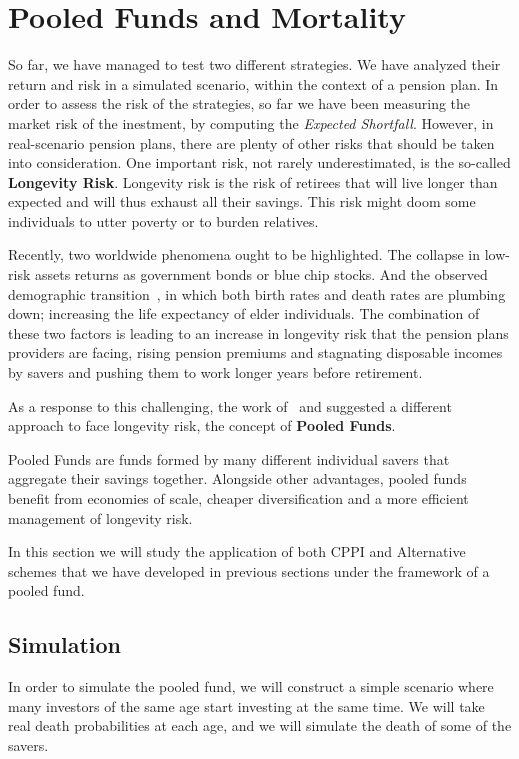 \section{Pooled Funds and Mortality}

So far, we have managed to test two different strategies. We have analyzed their return and risk in a simulated scenario, within the context of a pension plan. In order to assess the risk of the strategies, so far we have been measuring the market risk of the inestment, by computing the \emph{Expected Shortfall}. However, in real-scenario pension plans, there are plenty of other risks that should be taken into consideration. One important risk, not rarely underestimated, is the so-called \textbf{Longevity Risk}. Longevity risk is the risk of retirees that will live longer than expected and will thus exhaust all their savings. This risk might doom some individuals to utter poverty or to burden relatives.

Recently, two worldwide phenomena ought to be highlighted. The collapse in low-risk assets returns as government bonds or blue chip stocks. And the observed demographic transition~\textcite{b:demographic, a:bongaarts-human}, in which both birth rates and death rates are plumbing down; increasing the life expectancy of elder individuals. The combination of these two factors is leading to an increase in longevity risk that the pension plans providers are facing, rising pension premiums and stagnating disposable incomes by savers and pushing them to work longer years before retirement.

As a response to this challenging, the work of~\cite{a:donnelly-transparency} and \cite{a:brautigam-pool} suggested a different approach to face longevity risk,  the concept of \textbf{Pooled Funds}. 

Pooled Funds are funds formed by many different individual savers that aggregate their savings together. Alongside other advantages, pooled funds benefit from economies of scale, cheaper diversification and a more efficient management of longevity risk.

In this section we will study the application of both CPPI and Alternative schemes that we have developed in previous sections under the framework of a pooled fund. 


\subsection{Simulation}

In order to simulate the pooled fund, we will construct a simple scenario where many investors of the same age start investing at the same time. We will take real death probabilities at each age, and we will simulate the death of some of the savers. 

